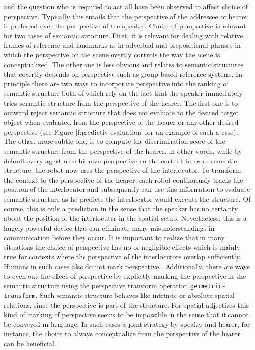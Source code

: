 \begin{description}
and the question who is required to act \citep{tversky2009perspective}
all have been observed to affect choice of perspective. Typically this
entails that the perspective of the addressee or hearer is preferred over
the perspective of the speaker. Choice of perspective is relevant for 
two cases of semantic structure. First, it is relevant for  
dealing with relative frames of reference and landmarks as in adverbial
and prepositional phrases in which the perspective on the scene 
overtly controls the way the scene is conceptualized. 
The other one is less obvious and relates to semantic structures that 
covertly depends on perspective such as 
group-based reference systems. In principle there are two ways 
to incorporate perspective into the ranking of semantic structure both of 
which rely on the fact that the speaker immediately tries semantic
structure from the perspective of the hearer. The first one is to outward
reject semantic structure that does not evaluate to the desired 
target object when evaluated from the perspective of the hearer or any
other desired perspective (see Figure \ref{f:predictiv-evaluation} 
for an example of such a case). 
The other, more subtle one, is to compute the discrimination score
of the semantic structure from the perspective of the hearer. In other words,
while by default every agent uses his own perspective on the context
to score semantic structure, the robot now uses the perspective of the interlocutor.
To transform the context to the perspective of the hearer, each robot
continuously tracks the position of the interlocutor and subsequently
can use this information to evaluate semantic structure as he
predicts the interlocutor would execute the structure. Of course,
this is only a prediction in the sense that the speaker has
no certainty about the position of the interlocutor in the spatial
setup. Nevertheless, this is a hugely powerful device that
can eliminate many misunderstandings in communication 
before they occur. It is important to realize that in many situations
the choice of perspective has no or negligible effects
which is mainly true for contexts where 
the perspective of the interlocutors overlap sufficiently.
Humans in such cases also do not mark perspective 
\citep{tenbrink2005dimensional}.
Additionally, there are ways to even out the effect
of perspective by explicitly marking the perspective in the semantic
structure using the perspective transform operation
{\footnotesize\tt geometric-transform}. Such semantic structure
behaves like intrinsic or absolute spatial relations, since
the perspective is part of the structure. For spatial
adjectives this kind of marking of perspective
seems to be impossible in the sense that it cannot be conveyed
in language. In such cases a joint strategy by speaker
and hearer, for instance, the choice to always conceptualize from
the perspective of the hearer can be beneficial.


\end{description}
